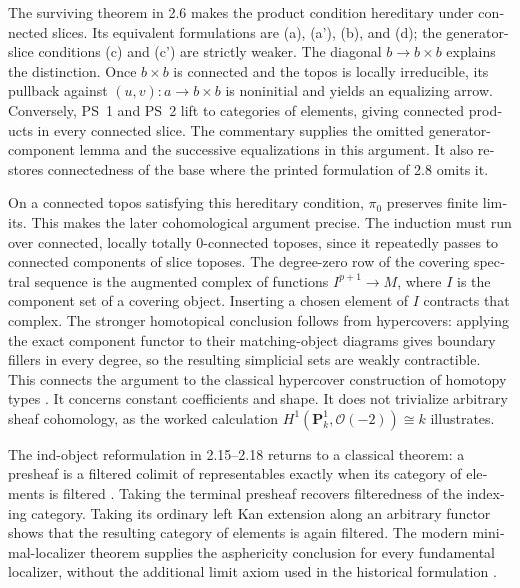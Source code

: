 \begin{otherlanguage}{english}
The surviving theorem in 2.6 makes the product condition hereditary under connected slices. Its equivalent formulations are (a), (a'), (b), and (d); the generator-slice conditions (c) and (c') are strictly weaker. The diagonal $b\to b\times b$ explains the distinction. Once $b\times b$ is connected and the topos is locally irreducible, its pullback against $(u,v):a\to b\times b$ is noninitial and yields an equalizing arrow. Conversely, PS~1 and PS~2 lift to categories of elements, giving connected products in every connected slice. The commentary supplies the omitted generator-component lemma and the successive equalizations in this argument. It also restores connectedness of the base where the printed formulation of 2.8 omits it.

On a connected topos satisfying this hereditary condition, $\pi_0$ preserves finite limits. This makes the later cohomological argument precise. The induction must run over connected, locally totally $0$-connected toposes, since it repeatedly passes to connected components of slice toposes. The degree-zero row of the covering spectral sequence is the augmented complex of functions $I^{p+1}\to M$, where $I$ is the component set of a covering object. Inserting a chosen element of $I$ contracts that complex. The stronger homotopical conclusion follows from hypercovers: applying the exact component functor to their matching-object diagrams gives boundary fillers in every degree, so the resulting simplicial sets are weakly contractible. This connects the argument to the classical hypercover construction of homotopy types \citep[\S\S8--9]{ArtinMazur1969}. It concerns constant coefficients and shape. It does not trivialize arbitrary sheaf cohomology, as the worked calculation $H^1(\mathbf P^1_k,\mathcal O(-2))\cong k$ illustrates.

The ind-object reformulation in 2.15--2.18 returns to a classical theorem: a presheaf is a filtered colimit of representables exactly when its category of elements is filtered \citep[Expos\'e~I, Theorem~8.3.3]{SGA4I1972}. Taking the terminal presheaf recovers filteredness of the indexing category. Taking its ordinary left Kan extension along an arbitrary functor shows that the resulting category of elements is again filtered. The modern minimal-localizer theorem supplies the asphericity conclusion for every fundamental localizer, without the additional limit axiom used in the historical formulation \citep[Theorem~2.2.11]{Cisinski2004Minimal}.


\end{otherlanguage}
